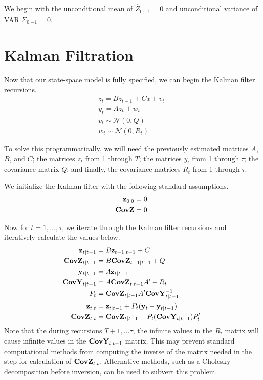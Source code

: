 \documentclass[11pt, letterpaper]{article}\usepackage[]{graphicx}\usepackage[]{color}
\newcommand{\vv}[1]{\textcolor{black}{\mathbf{#1}}}
\begin{document}
We begin with the unconditional mean of $\widehat{Z}_{0|-1} = 0$ and unconditional variance of VAR $\Sigma_{0|-1} = 0$.

\section{Kalman Filtration}
Now that our state-space model is fully specified, we can begin the Kalman filter recursions.
\begin{align*}
	z_t = B z_{t-1} + Cx + v_t\\
	y_t = A z_t + w_t\\
	v_t \sim \mathcal{N}(0, Q)\\
	w_t \sim \mathcal{N}(0, R_t)
\end{align*}

To solve this programmatically, we will need the previously estimated matrices $A$, $B$, and $C$; the matrices $z_t$ from 1 through $T$; the matrices $y_t$ from 1 through $\tau$; the covariance matrix $Q$; and finally, the covariance matrices $R_t$ from 1 through $\tau$.

We initialize the Kalman filter with the following standard assumptions. 
\begin{align*}
	\vv{z}_{0|0} = 0\\
	\vv{CovZ} = 0
\end{align*}

Now for $t = 1, \dots, \tau$, we iterate through the Kalman filter recursions and iteratively calculate the values below.
\begin{align*}
	\vv{z}_{t|t-1} &= B \vv{z}_{t-1|t-1} + C\\
	\vv{CovZ}_{t|t-1} &= B \vv{CovZ}_{t-1|t-1} + Q\\
	\vv{y}_{t|t-1} &= A \vv{z}_{t|t-1}\\
	\vv{CovY}_{t|t-1} &= A \vv{CovZ}_{t|t-1} A' + R_t\\
	P_t &= \vv{CovZ}_{t|t-1} A' \vv{CovY}^{-1}_{t|t-1}\\
	\vv{z}_{t|t} &= \vv{z}_{t|t-1} + P_t (\vv{y}_t - \vv{y}_{t|t-1})\\
	\vv{CovZ}_{t|t} &= \vv{CovZ}_{t|t-1} - P_t (\vv{CovY}_{t|t-1}) P'_t
\end{align*}
Note that the during recursions $T + 1, \dots \tau$, the infinite values in the $R_t$ matrix will cause infinite values in the $\vv{CovY}_{t|t-1}$ matrix. This may prevent standard computational methods from computing the inverse of the matrix needed in the step for calculation of $\vv{CovZ}_{t|t}$. Alternative methods, such as a Cholesky decomposition before inversion, can be used to subvert this problem.
\end{document}
